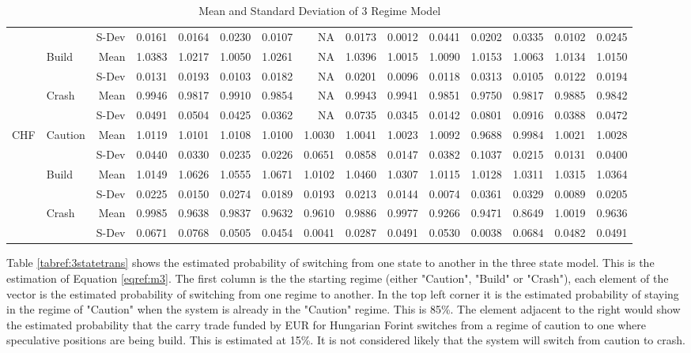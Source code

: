 \documentclass[12pt, a4paper, oneside]{article} %
\begin{document}
\begin{landscape}
\begin{table}[ht]
\begin{tabular}{llrrrrrrrrrrrrr}
  && S-Dev & 0.0161 & 0.0164 & 0.0230 & 0.0107 & NA & 0.0173 & 0.0012 & 0.0441 & 0.0202 & 0.0335 & 0.0102 & 0.0245\\ 
  & \multirow{2}{*}{Build} &  Mean & 1.0383 & 1.0217 & 1.0050 & 1.0261 & NA & 1.0396 & 1.0015 & 1.0090 & 1.0153 & 1.0063 & 1.0134 & 1.0150\\ 
  && S-Dev & 0.0131 & 0.0193 & 0.0103 & 0.0182 & NA & 0.0201 & 0.0096 & 0.0118 & 0.0313 & 0.0105 & 0.0122 & 0.0194\\ 
  & \multirow{2}{*}{Crash} & Mean & 0.9946 & 0.9817 & 0.9910 & 0.9854 & NA & 0.9943 & 0.9941 & 0.9851 & 0.9750 & 0.9817 & 0.9885 & 0.9842 \\ 
  &&S-Dev & 0.0491 & 0.0504 & 0.0425 & 0.0362 & NA & 0.0735 & 0.0345 & 0.0142 & 0.0801 & 0.0916 & 0.0388 & 0.0472\\ 
\hline
\multirow{6}{*}{CHF}& \multirow{2}{*}{Caution} & Mean & 1.0119 & 1.0101 & 1.0108 & 1.0100 & 1.0030 & 1.0041 & 1.0023 & 1.0092 & 0.9688 & 0.9984 & 1.0021 & 1.0028\\ 
  && S-Dev& 0.0440 & 0.0330 & 0.0235 & 0.0226 & 0.0651 & 0.0858 & 0.0147 & 0.0382 & 0.1037 & 0.0215 & 0.0131 & 0.0400\\ 
  & \multirow{2}{*}{Build} & Mean & 1.0149 & 1.0626 & 1.0555 & 1.0671 & 1.0102 & 1.0460 & 1.0307 & 1.0115 & 1.0128 & 1.0311 & 1.0315 & 1.0364\\ 
  && S-Dev & 0.0225 & 0.0150 & 0.0274 & 0.0189 & 0.0193 & 0.0213 & 0.0144 & 0.0074 & 0.0361 & 0.0329 & 0.0089 & 0.0205\\ 
  & \multirow{2}{*}{Crash} & Mean & 0.9985 & 0.9638 & 0.9837 & 0.9632 & 0.9610 & 0.9886 & 0.9977 & 0.9266 & 0.9471 & 0.8649 & 1.0019 & 0.9636 \\ 
  && S-Dev& 0.0671 & 0.0768 & 0.0505 & 0.0454 & 0.0041 & 0.0287 & 0.0491 & 0.0530 & 0.0038 & 0.0684 & 0.0482 & 0.0491\\ 
   \hline
\end{tabular}
\caption{Mean and Standard Deviation of 3 Regime Model}
\label{tabref:3statemod}
\end{table}
\end{landscape}

Table \ref{tabref:3statetrans} shows the estimated probability of switching from one state to another in the three state model.  This is the estimation of Equation \ref{eqref:m3}.  The first column is the  the starting regime (either "Caution", "Build" or "Crash"), each element of the vector is the estimated probability of switching from one regime to another. In the top left corner it is the estimated probability of staying in the regime of "Caution" when the system is already in the "Caution" regime.  This is 85\%.  The element adjacent to the right would show the estimated probability that the carry trade funded by EUR for Hungarian Forint switches from a regime of caution to one where speculative positions are being build.  This is estimated at 15\%.  It is not considered likely that the system will switch from caution to crash.  
\end{document}
